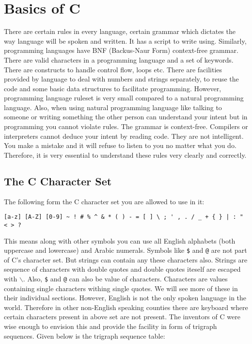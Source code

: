 \chapter{Basics of C}
There are certain rules in every language, certain grammar which dictates the
way language will be spoken and written. It has a script to write
using. Similarly, programming languages have BNF (Backus-Naur Form)
context-free grammar. There are valid characters in a programming language and
a set of keywords. There are constructs to handle control flow, loops
etc. There are facilities provided by language to deal with numbers and strings
separately, to reuse the code and some basic data structures to facilitate
programming. However, programming language ruleset is very small compared
to a natural programming language. Also, when using natural programming
language like talking to someone or writing something the other person can
understand your intent but in programming you cannot violate rules. The grammar
is context-free. Compilers or interpreters cannot deduce your intent by reading
code. They are not intelligent. You make a mistake and it will refuse to listen
to you no matter what you do. Therefore, it is very essential to understand
these rules very clearly and correctly.

\section{The C Character Set}
The following form the C character set you are allowed to use in it:

\begin{verbatim}
[a-z] [A-Z] [0-9] ~ ! # % ^ & * ( ) - = [ ] \ ; ' , . / _ + { } | : " < > ?
\end{verbatim}

This means along with other symbols you can use all English alphabets (both
uppercase and lowercase) and Arabic numerals. Symbols like \texttt{\$} and
\texttt{@} are not part of C's character set. But strings can contain any
these characters also. Strings are sequence of characters with double quotes
and double quotes iteself are escaped with \texttt{$\backslash$}. Also,
\texttt{\$} and \texttt{@} can also be value of characters. Characters are
values containing single characters withing single quotes. We will see more of
these in their individual sections. However, English is not the only
spoken language in the world. Therefore in other non-English speaking counties
there are keyboard where certain characters present in above set are not
present. The inventors of C were wise enough to envision this and provide the
facility in form of trigraph sequences. Given below is the trigraph sequence
table:

